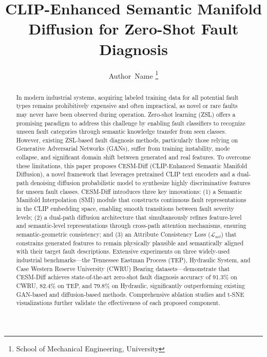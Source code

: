 \documentclass[journal]{IEEEtran}
\begin{document}
\title{CLIP-Enhanced Semantic Manifold Diffusion for Zero-Shot Fault Diagnosis}

\author{Author~Name%
\thanks{School of Mechanical Engineering, University}}

\maketitle

\begin{abstract}
In modern industrial systems, acquiring labeled training data for all potential fault types remains prohibitively expensive and often impractical, as novel or rare faults may never have been observed during operation. Zero-shot learning (ZSL) offers a promising paradigm to address this challenge by enabling fault classifiers to recognize unseen fault categories through semantic knowledge transfer from seen classes. However, existing ZSL-based fault diagnosis methods, particularly those relying on Generative Adversarial Networks (GANs), suffer from training instability, mode collapse, and significant domain shift between generated and real features. To overcome these limitations, this paper proposes CESM-Diff (CLIP-Enhanced Semantic Manifold Diffusion), a novel framework that leverages pretrained CLIP text encoders and a dual-path denoising diffusion probabilistic model to synthesize highly discriminative features for unseen fault classes. CESM-Diff introduces three key innovations: (1) a Semantic Manifold Interpolation (SMI) module that constructs continuous fault representations in the CLIP embedding space, enabling smooth transitions between fault severity levels; (2) a dual-path diffusion architecture that simultaneously refines feature-level and semantic-level representations through cross-path attention mechanisms, ensuring semantic-geometric consistency; and (3) an Attribute Consistency Loss ($\mathcal{L}_{acl}$) that constrains generated features to remain physically plausible and semantically aligned with their target fault descriptions. Extensive experiments on three widely-used industrial benchmarks---the Tennessee Eastman Process (TEP), Hydraulic System, and Case Western Reserve University (CWRU) Bearing datasets---demonstrate that CESM-Diff achieves state-of-the-art zero-shot fault diagnosis accuracy of 91.3\% on CWRU, 82.4\% on TEP, and 79.8\% on Hydraulic, significantly outperforming existing GAN-based and diffusion-based methods. Comprehensive ablation studies and t-SNE visualizations further validate the effectiveness of each proposed component.
\end{abstract}
\end{document}
